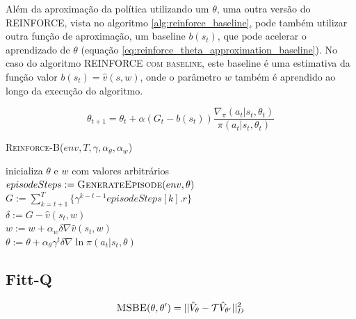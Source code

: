 \documentclass[letterpaper]{article}
\begin{document}
Além da aproximação da política utilizando um $\theta$, uma outra versão do \textsc{REINFORCE}, vista no algoritmo \ref{alg:reinforce_baseline}, pode também utilizar outra função de aproximação, um baseline $b(s_t)$, que pode acelerar o aprendizado de $\theta$ (equação \ref{eq:reinforce_theta_approximation_baseline}). No caso do algoritmo \textsc{REINFORCE com baseline}, este baseline é uma estimativa da função valor $b(s_t) = \hat{v}(s, w)$, onde o parâmetro $w$ também é aprendido ao longo da execução do algoritmo.

\begin{equation}
  \label{eq:reinforce_theta_approximation_baseline}
  \theta_{t+1} = \theta_t + \alpha (G_t - b(s_t)) \frac{\nabla_{\pi}(a_t|s_t, \theta_t)}{\pi(a_t|s_t, \theta_t)} 
\end{equation}

\linesnumbered
\dontprintsemicolon
\begin{algorithm}[t!]
{
	\caption{\textsc{Reinforce-B}($ env, T, \gamma, \alpha_{\theta}, \alpha_{w} $)}
	\label{alg:reinforce_baseline}
    inicializa $ \theta $ e $ w $ com valores arbitrários \\

    {
      $episodeSteps := \textsc{GenerateEpisode}(env, \theta)$\\

      {
        $G := \sum_{k = t+1}^T \{ \gamma^{k-t-1} episodeSteps[k].r \}$\\
        $ \delta := G - \hat{v}(s_t, w) $\\
        $ w := w + \alpha_w \delta \nabla \hat{v}(s_t, w) $\\
        $ \theta := \theta + \alpha_{\theta} \gamma^t \delta \nabla \ln \pi(a_t|s_t, \theta) $
      }
    }
}
\end{algorithm}

\subsection{Fitt-Q}


\begin{equation} \label{eq:msbe}
  \textsc{MSBE}(\theta, \theta') = || \hat{V}_{\theta} - \mathcal{T} \hat{V}_{\theta'} ||^2_D
\end{equation}
\end{document}
